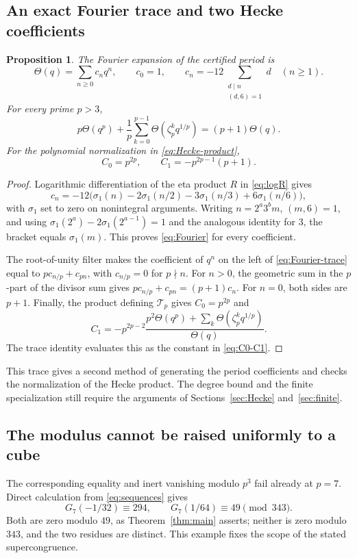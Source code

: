 \documentclass[11pt,a4paper]{article}
\newtheorem{proposition}[theorem]{Proposition}
\theoremstyle{remark}
\newcommand{\Tp}{\mathcal T_p}
\begin{document}
\subsection{An exact Fourier trace and two Hecke coefficients}
\begin{proposition}\label{prop:Fourier-trace}
The Fourier expansion of the certified period is
\begin{equation}\label{eq:Fourier}
 \Theta(q)=\sum_{n\ge0}c_nq^n,\qquad c_0=1,\qquad
 c_n=-12\sum_{\substack{d\mid n\\(d,6)=1}}d\quad(n\ge1).
\end{equation}
For every prime $p>3$,
\begin{equation}\label{eq:Fourier-trace}
 p\Theta(q^p)+\frac1p\sum_{k=0}^{p-1}
 \Theta(\zeta_p^kq^{1/p})=(p+1)\Theta(q).
\end{equation}
For the polynomial normalization in \eqref{eq:Hecke-product},
\begin{equation}\label{eq:C0-C1}
 C_0=p^{2p},\qquad C_1=-p^{2p-1}(p+1).
\end{equation}
\end{proposition}
\begin{proof}
Logarithmic differentiation of the eta product $R$ in
\eqref{eq:logR} gives
\[
 c_n=-12\bigl(\sigma_1(n)-2\sigma_1(n/2)
                  -3\sigma_1(n/3)+6\sigma_1(n/6)\bigr),
\]
with $\sigma_1$ set to zero on nonintegral arguments.
Writing $n=2^a3^bm$, $(m,6)=1$, and using
$\sigma_1(2^a)-2\sigma_1(2^{a-1})=1$ and the analogous identity
for $3$, the bracket equals $\sigma_1(m)$.
This proves \eqref{eq:Fourier} for every coefficient.

The root-of-unity filter makes the coefficient of $q^n$ on the
left of \eqref{eq:Fourier-trace} equal to
$p c_{n/p}+c_{pn}$, with $c_{n/p}=0$ for $p\nmid n$.
For $n>0$, the geometric sum in the $p$-part of the divisor sum
gives $p c_{n/p}+c_{pn}=(p+1)c_n$.
For $n=0$, both sides are $p+1$.
Finally, the product defining $\Tp$ gives $C_0=p^{2p}$ and
\[
 C_1=-p^{2p-2}
 \frac{p^2\Theta(q^p)+\sum_k\Theta(\zeta_p^kq^{1/p})}{\Theta(q)}.
\]
The trace identity evaluates this as the constant in
\eqref{eq:C0-C1}.
\end{proof}

This trace gives a second method of generating the period coefficients
and checks the normalization of the Hecke product.
The degree bound and the finite specialization still require the
arguments of Sections~\ref{sec:Hecke} and~\ref{sec:finite}.

\subsection{The modulus cannot be raised uniformly to a cube}
The corresponding equality and inert vanishing modulo $p^3$ fail
already at $p=7$. Direct calculation from \eqref{eq:sequences} gives
\begin{equation}\label{eq:p3-limit}
 G_7(-1/32)\equiv294,\qquad G_7(1/64)\equiv49\pmod{343}.
\end{equation}
Both are zero modulo $49$, as Theorem~\ref{thm:main} asserts;
neither is zero modulo $343$, and the two residues are distinct.
This example fixes the scope of the stated supercongruence.
\end{document}

